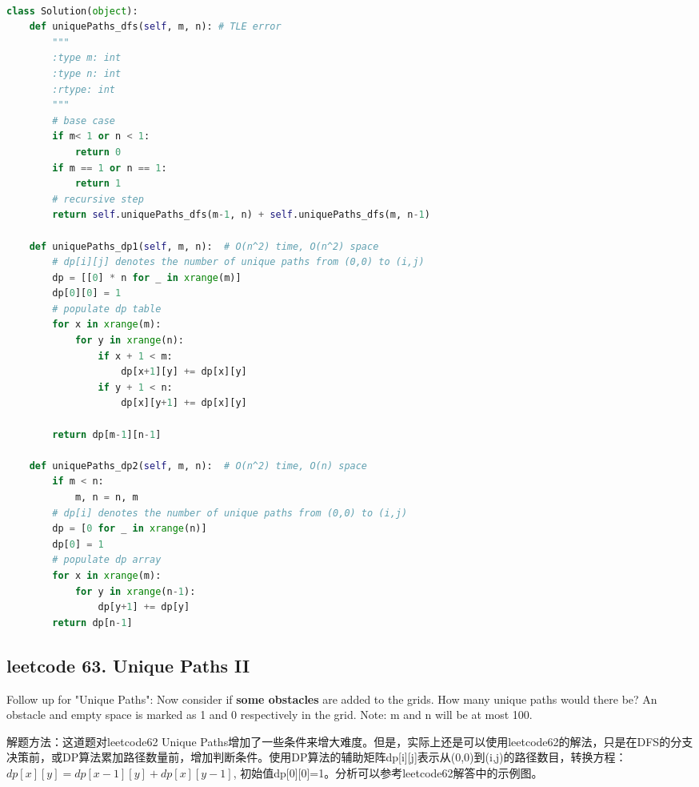 \documentclass[a4paper,10pt]{article}
\begin{document}
\begin{lstlisting}[language=Python, caption=Problem62. Unique Paths]

class Solution(object):
    def uniquePaths_dfs(self, m, n): # TLE error
        """
        :type m: int
        :type n: int
        :rtype: int
        """
        # base case
        if m< 1 or n < 1:
            return 0
        if m == 1 or n == 1:
            return 1
        # recursive step
        return self.uniquePaths_dfs(m-1, n) + self.uniquePaths_dfs(m, n-1)

    def uniquePaths_dp1(self, m, n):  # O(n^2) time, O(n^2) space
        # dp[i][j] denotes the number of unique paths from (0,0) to (i,j)
        dp = [[0] * n for _ in xrange(m)]
        dp[0][0] = 1
        # populate dp table
        for x in xrange(m):
            for y in xrange(n):
                if x + 1 < m:
                    dp[x+1][y] += dp[x][y]
                if y + 1 < n:
                    dp[x][y+1] += dp[x][y]

        return dp[m-1][n-1]

    def uniquePaths_dp2(self, m, n):  # O(n^2) time, O(n) space
        if m < n:
            m, n = n, m
        # dp[i] denotes the number of unique paths from (0,0) to (i,j)
        dp = [0 for _ in xrange(n)]
        dp[0] = 1
        # populate dp array
        for x in xrange(m):
            for y in xrange(n-1):
                dp[y+1] += dp[y]
        return dp[n-1]
\end{lstlisting}


\subsection{leetcode 63. Unique Paths II}
Follow up for "Unique Paths": Now consider if \textbf{some obstacles} are added to the grids. How many unique paths would there be? An obstacle and empty space is marked as 1 and 0 respectively in the grid. Note: m and n will be at most 100. \\

\begin{CJK*}{UTF8}{gbsn}
\noindent 解题方法：这道题对leetcode62 Unique Paths增加了一些条件来增大难度。但是，实际上还是可以使用leetcode62的解法，只是在DFS的分支决策前，或DP算法累加路径数量前，增加判断条件。使用DP算法的辅助矩阵dp[i][j]表示从(0,0)到(i,j)的路径数目，转换方程：$dp[x][y] = dp[x-1][y] + dp[x][y-1]$, 初始值dp[0][0]=1。分析可以参考leetcode62解答中的示例图。\\
\end{CJK*}
\end{document}
